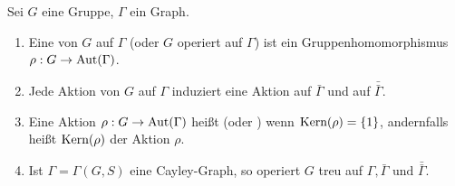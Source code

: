\documentclass[a4paper, 10pt]{report}
\begin{document}
\begin{DefFolg} 
Sei $G$ eine Gruppe, $\Gamma$ ein Graph.
\begin{enumerate}
  \item Eine  von $G$ auf $\Gamma$ (oder $G$ operiert
  auf $\Gamma$) ist ein Gruppenhomomorphismus $\rho: G \to \mbox{Aut}(\Gamma)$.
  \item Jede Aktion von $G$ auf $\Gamma$ induziert eine Aktion auf
  $\bar{\Gamma}$ und auf $\bar{\bar{\Gamma}}$.
  \item Eine Aktion $\rho: G \to \mbox{Aut}(\Gamma)$ heißt 
  (oder ) wenn $\mbox{Kern}(\rho) = \{1\}$,
  andernfalls heißt $\mbox{Kern}(\rho)$
   der Aktion $\rho$.
  \item Ist $\Gamma = \Gamma(G,S)$ eine Cayley-Graph, so operiert $G$ treu auf
  $\Gamma, \bar{\Gamma} \textrm{ und }\bar{\bar{\Gamma}}$.
\end{enumerate}
\end{DefFolg}
\end{document}
